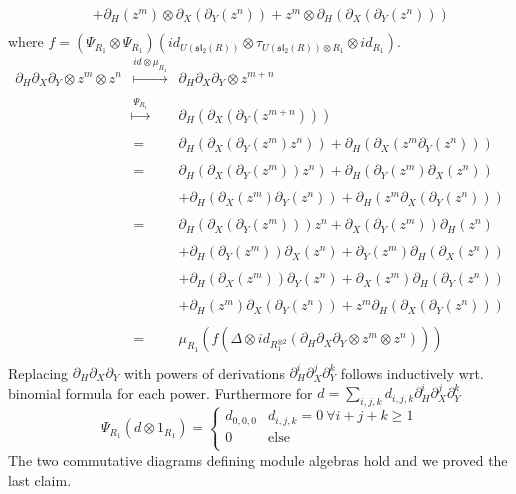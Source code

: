 \documentclass[10pt,a4paper]{article}
\begin{document}
\begin{description}
$$\begin{array}{rcl}
&& + \partial_H(z^m) \otimes \partial_X(\partial_Y(z^n)) + z^m \otimes \partial_H(\partial_X(\partial_Y(z^n)))\\
\end{array}$$
where $f = (\Psi_{R_1} \otimes \Psi_{R_1}) (id_{U(\mathfrak{sl}_2(R))} \otimes \tau_{U(\mathfrak{sl}_2(R)) \otimes R_1}\otimes id_{R_1})$.
$$\begin{array}{rcl}
\partial_H\partial_X\partial_Y \otimes z^m \otimes z^n &\stackrel{id \otimes \mu_{R_1}}{\longmapsto}&
\partial_H \partial_X \partial_Y \otimes z^{m + n}\\
&&\\
&\stackrel{\Psi_{R_1}}{\longmapsto}& \partial_H(\partial_X(\partial_Y(z^{m + n})))\\
&&\\
&=& \partial_H(\partial_X(\partial_Y(z^m) z^{n})) + \partial_H(\partial_X(z^m \partial_Y(z^n)))\\
&&\\
&=& \partial_H(\partial_X(\partial_Y(z^m)) z^{n}) + \partial_H(\partial_Y(z^m) \partial_X(z^{n}))\\
&&\\
&& + \partial_H(\partial_X(z^m) \partial_Y(z^n)) + \partial_H(z^m \partial_X(\partial_Y(z^n)))\\
&&\\
&=& \partial_H(\partial_X(\partial_Y(z^m))) z^{n} + \partial_X(\partial_Y(z^m)) \partial_H(z^n)\\
&&\\
&& + \partial_H(\partial_Y(z^m)) \partial_X(z^{n}) + \partial_Y(z^m) \partial_H(\partial_X(z^n))\\
&&\\
&& + \partial_H(\partial_X(z^m)) \partial_Y(z^n) + \partial_X(z^m) \partial_H(\partial_Y(z^n))\\
&&\\
&& + \partial_H(z^m) \partial_X(\partial_Y(z^n)) + z^m \partial_H(\partial_X(\partial_Y(z^n)))\\
&&\\
&=& \mu_{R_1}(f(\Delta \otimes id_{R_1^{\otimes 2}}(\partial_H \partial_X \partial_Y \otimes z^m \otimes z^n)))\\%
\end{array}$$
Replacing $\partial_H \partial_X \partial_Y$ with powers of derivations $\partial_H^i \partial_X^j \partial_Y^k$ follows inductively wrt. binomial formula for each power. Furthermore for $d = \sum_{i,j,k} d_{i,j,k} \partial_H^i \partial_X^j \partial_Y^k$
$$\Psi_{R_1} (d \otimes 1_{R_1}) = \begin{cases}
d_{0,0,0} & d_{i,j,k} = 0\ \forall i + j + k \geq 1\\
0 & \mathrm{else}\\
\end{cases}$$
The two commutative diagrams defining module algebras hold and we proved the last claim.
\end{description}
\end{document}
